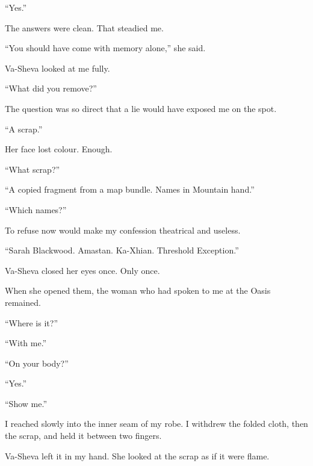 ``Yes.''\par

The answers were clean. That steadied me.\par

``You should have come with memory alone,'' she said.\par

Va-Sheva looked at me fully.\par

``What did you remove?''\par

The question was so direct that a lie would have exposed me on the spot.\par

``A scrap.''\par

Her face lost colour. Enough.\par

``What scrap?''\par

``A copied fragment from a map bundle. Names in Mountain hand.''\par

``Which names?''\par

To refuse now would make my confession theatrical and useless.\par

``Sarah Blackwood. Amastan. Ka-Xhian. Threshold Exception.''\par

Va-Sheva closed her eyes once. Only once.\par

When she opened them, the woman who had spoken to me at the Oasis remained.\par

``Where is it?''\par

``With me.''\par

``On your body?''\par

``Yes.''\par

``Show me.''\par

I reached slowly into the inner seam of my robe. I withdrew the folded cloth, then the scrap, and held it between two fingers.\par

Va-Sheva left it in my hand. She looked at the scrap as if it were flame.\par

